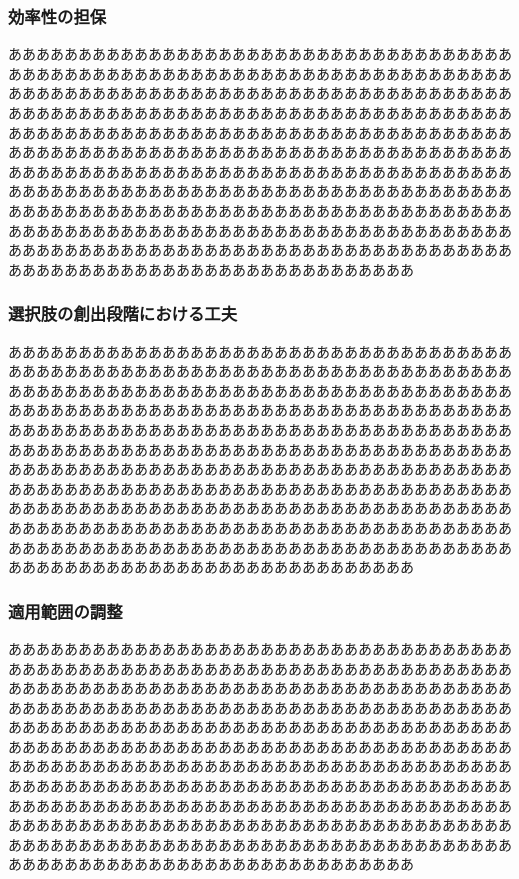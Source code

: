 \documentclass[a4paper, 11pt]{jsarticle}
\begin{document}
\subsubsection{効率性の担保}
あああああああああああああああああああああああああああああああああああああああああああああああああああああああああああああああああああああああああああああああああああああああああああああああああああああああああああああああああああああああああああああああああああああああああああああああああああああああああああああああああああああああああああああああああああああああああああああああああああああああああああああああああああああああああああああああああああああああああああああああああああああああああああああああああああああああああああああああああああああああああああああああああああああああああああああああああああああああああああああああああああああああああああああああああああああああああああああああああああああああああああああああああああああああああああああああああああああああああああああああああああああああああああああああああああああああああ
\subsubsection{選択肢の創出段階における工夫}
あああああああああああああああああああああああああああああああああああああああああああああああああああああああああああああああああああああああああああああああああああああああああああああああああああああああああああああああああああああああああああああああああああああああああああああああああああああああああああああああああああああああああああああああああああああああああああああああああああああああああああああああああああああああああああああああああああああああああああああああああああああああああああああああああああああああああああああああああああああああああああああああああああああああああああああああああああああああああああああああああああああああああああああああああああああああああああああああああああああああああああああああああああああああああああああああああああああああああああああああああああああああああああああああああああああああああ
\subsubsection{適用範囲の調整}
あああああああああああああああああああああああああああああああああああああああああああああああああああああああああああああああああああああああああああああああああああああああああああああああああああああああああああああああああああああああああああああああああああああああああああああああああああああああああああああああああああああああああああああああああああああああああああああああああああああああああああああああああああああああああああああああああああああああああああああああああああああああああああああああああああああああああああああああああああああああああああああああああああああああああああああああああああああああああああああああああああああああああああああああああああああああああああああああああああああああああああああああああああああああああああああああああああああああああああああああああああああああああああああああああああああああああ
\end{document}
